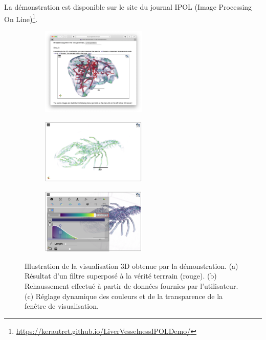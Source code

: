 La démonstration est disponible sur le site du journal IPOL (Image Processing On Line)\footnote{\url{ https://kerautret.github.io/LiverVesselnessIPOLDemo/}}.

\begin{figure}[!t]
\noindent   
\centering
    \begin{subfigure}{0.33\textwidth}
        \centering
        \includegraphics[width=5cm, trim= 4.7cm 5cm 4.7cm 8.5cm, clip=true]{Images/visuDemoViewer.png}
        \caption{ }
    \end{subfigure}
    \begin{subfigure}{0.33\textwidth}
        \centering
        \includegraphics[width=5cm]{Images/visuDemoViewerExtract.png}
        \caption{ }
    \end{subfigure}
    \begin{subfigure}{0.33\textwidth}
        \centering
        \includegraphics[width=5cm]{Images/visuDemoViewerExtract2.png}
        \caption{ }
    \end{subfigure}

  \caption{Illustration de la visualisation 3D obtenue par la démonstration. (a) Résultat d'un filtre superposé à la vérité terrrain (rouge). (b) Rehaussement effectué à partir de données fournies par l'utilisateur. (c) Réglage dynamique des couleurs et de la transparence de la fenêtre de visualisation.}
\label{Fig:Illustr3D}
\end{figure}

